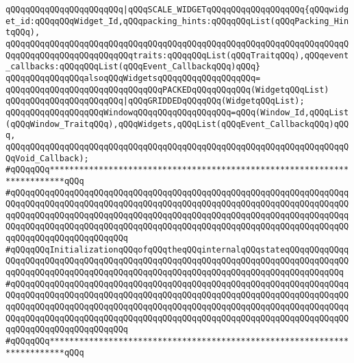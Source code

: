 \verb|qQQqqQQqqQQqqQQqqQQqqQQq|\verb#|qQQqSCALE_WIDGETqQQqqQQqqQQqqQQqqQQq{qQQqwidget_id:qQQqqQQqWidget_Id,qQQqpacking_hints:qQQqqQQqList(qQQqPacking_HintqQQq),#\newline
\verb|qQQqqQQqqQQqqQQqqQQqqQQqqQQqqQQqqQQqqQQqqQQqqQQqqQQqqQQqqQQqqQQqqQQqqQQqqQQqqQQqqQQqqQQqqQQqqQQqtraits:qQQqqQQqList(qQQqTraitqQQq),qQQqevent_callbacks:qQQqqQQqList(qQQqEvent_CallbackqQQq)qQQq}|\newline
\newline
\verb|qQQqqQQqqQQqqQQqalsoqQQqWidgetsqQQqqQQqqQQqqQQqqQQq=|\newline
\verb|qQQqqQQqqQQqqQQqqQQqqQQqqQQqqQQqPACKEDqQQqqQQqqQQq(WidgetqQQqList)|\newline
\verb|qQQqqQQqqQQqqQQqqQQqqQQq|\verb#|qQQqGRIDDEDqQQqqQQq(WidgetqQQqList);#\newline
\newline
\verb|qQQqqQQqqQQqqQQqqQQqWindowqQQqqQQqqQQqqQQqqQQq=qQQq(Window_Id,qQQqList(qQQqWindow_TraitqQQq),qQQqWidgets,qQQqList(qQQqEvent_CallbackqQQq)qQQq,|\newline
\verb|qQQqqQQqqQQqqQQqqQQqqQQqqQQqqQQqqQQqqQQqqQQqqQQqqQQqqQQqqQQqqQQqqQQqqQQqVoid_Callback);|\newline
\newline
\newline
\newline
\verb|#qQQqqQQq*************************************************************************qQQq|\newline
\verb|#qQQqqQQqqQQqqQQqqQQqqQQqqQQqqQQqqQQqqQQqqQQqqQQqqQQqqQQqqQQqqQQqqQQqqQQqqQQqqQQqqQQqqQQqqQQqqQQqqQQqqQQqqQQqqQQqqQQqqQQqqQQqqQQqqQQqqQQqqQQqqQQqqQQqqQQqqQQqqQQqqQQqqQQqqQQqqQQqqQQqqQQqqQQqqQQqqQQqqQQqqQQqqQQqqQQqqQQqqQQqqQQqqQQqqQQqqQQqqQQqqQQqqQQqqQQqqQQqqQQqqQQqqQQqqQQqqQQqqQQqqQQqqQQqqQQqqQQqqQQqqQQq|\newline
\verb|#qQQqqQQqInitializationqQQqofqQQqtheqQQqinternalqQQqstateqQQqqQQqqQQqqQQqqQQqqQQqqQQqqQQqqQQqqQQqqQQqqQQqqQQqqQQqqQQqqQQqqQQqqQQqqQQqqQQqqQQqqQQqqQQqqQQqqQQqqQQqqQQqqQQqqQQqqQQqqQQqqQQqqQQqqQQqqQQqqQQqqQQqqQQq|\newline
\verb|#qQQqqQQqqQQqqQQqqQQqqQQqqQQqqQQqqQQqqQQqqQQqqQQqqQQqqQQqqQQqqQQqqQQqqQQqqQQqqQQqqQQqqQQqqQQqqQQqqQQqqQQqqQQqqQQqqQQqqQQqqQQqqQQqqQQqqQQqqQQqqQQqqQQqqQQqqQQqqQQqqQQqqQQqqQQqqQQqqQQqqQQqqQQqqQQqqQQqqQQqqQQqqQQqqQQqqQQqqQQqqQQqqQQqqQQqqQQqqQQqqQQqqQQqqQQqqQQqqQQqqQQqqQQqqQQqqQQqqQQqqQQqqQQqqQQqqQQqqQQqqQQq|\newline
\verb|#qQQqqQQq*************************************************************************qQQq|\newline
